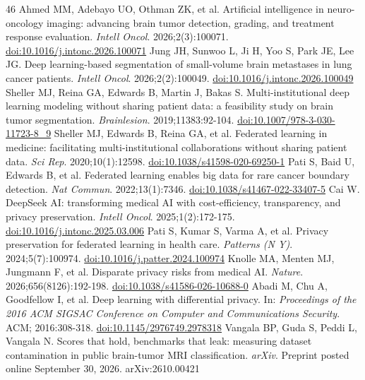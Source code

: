 \begin{thebibliography}{46}
 Ahmed MM, Adebayo UO, Othman ZK, et al. Artificial intelligence in neuro-oncology imaging: advancing brain tumor detection, grading, and treatment response evaluation. \textit{Intell Oncol}. 2026;2(3):100071. \href{https://doi.org/10.1016/j.intonc.2026.100071}{doi:10.1016/j.intonc.2026.100071}
 Jung JH, Sunwoo L, Ji H, Yoo S, Park JE, Lee JG. Deep learning-based segmentation of small-volume brain metastases in lung cancer patients. \textit{Intell Oncol}. 2026;2(2):100049. \href{https://doi.org/10.1016/j.intonc.2026.100049}{doi:10.1016/j.intonc.2026.100049}
 Sheller MJ, Reina GA, Edwards B, Martin J, Bakas S. Multi-institutional deep learning modeling without sharing patient data: a feasibility study on brain tumor segmentation. \textit{Brainlesion}. 2019;11383:92-104. \href{https://doi.org/10.1007/978-3-030-11723-8_9}{doi:10.1007/978-3-030-11723-8\_9}
 Sheller MJ, Edwards B, Reina GA, et al. Federated learning in medicine: facilitating multi-institutional collaborations without sharing patient data. \textit{Sci Rep}. 2020;10(1):12598. \href{https://doi.org/10.1038/s41598-020-69250-1}{doi:10.1038/s41598-020-69250-1}
 Pati S, Baid U, Edwards B, et al. Federated learning enables big data for rare cancer boundary detection. \textit{Nat Commun}. 2022;13(1):7346. \href{https://doi.org/10.1038/s41467-022-33407-5}{doi:10.1038/s41467-022-33407-5}
 Cai W. DeepSeek AI: transforming medical AI with cost-efficiency, transparency, and privacy preservation. \textit{Intell Oncol}. 2025;1(2):172-175. \href{https://doi.org/10.1016/j.intonc.2025.03.006}{doi:10.1016/j.intonc.2025.03.006}
 Pati S, Kumar S, Varma A, et al. Privacy preservation for federated learning in health care. \textit{Patterns (N Y)}. 2024;5(7):100974. \href{https://doi.org/10.1016/j.patter.2024.100974}{doi:10.1016/j.patter.2024.100974}
 Knolle MA, Menten MJ, Jungmann F, et al. Disparate privacy risks from medical AI. \textit{Nature}. 2026;656(8126):192-198. \href{https://doi.org/10.1038/s41586-026-10688-0}{doi:10.1038/s41586-026-10688-0}
 Abadi M, Chu A, Goodfellow I, et al. Deep learning with differential privacy. In: \textit{Proceedings of the 2016 ACM SIGSAC Conference on Computer and Communications Security}. ACM; 2016:308-318. \href{https://doi.org/10.1145/2976749.2978318}{doi:10.1145/2976749.2978318}
 Vangala BP, Guda S, Peddi L, Vangala N. Scores that hold, benchmarks that leak: measuring dataset contamination in public brain-tumor MRI classification. \textit{arXiv}. Preprint posted online September 30, 2026. arXiv:2610.00421

\end{thebibliography}

